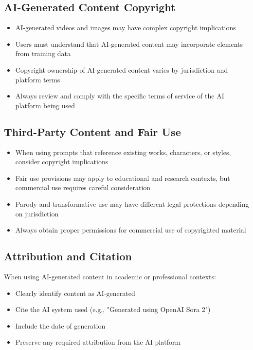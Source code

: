 \subsection{AI-Generated Content Copyright}
\begin{itemize}
\item AI-generated videos and images may have complex copyright implications
\item Users must understand that AI-generated content may incorporate elements from training data
\item Copyright ownership of AI-generated content varies by jurisdiction and platform terms
\item Always review and comply with the specific terms of service of the AI platform being used
\end{itemize}

\subsection{Third-Party Content and Fair Use}
\begin{itemize}
\item When using prompts that reference existing works, characters, or styles, consider copyright implications
\item Fair use provisions may apply to educational and research contexts, but commercial use requires careful consideration
\item Parody and transformative use may have different legal protections depending on jurisdiction
\item Always obtain proper permissions for commercial use of copyrighted material
\end{itemize}

\subsection{Attribution and Citation}
When using AI-generated content in academic or professional contexts:
\begin{itemize}
\item Clearly identify content as AI-generated
\item Cite the AI system used (e.g., "Generated using OpenAI Sora 2")
\item Include the date of generation
\item Preserve any required attribution from the AI platform
\end{itemize}

